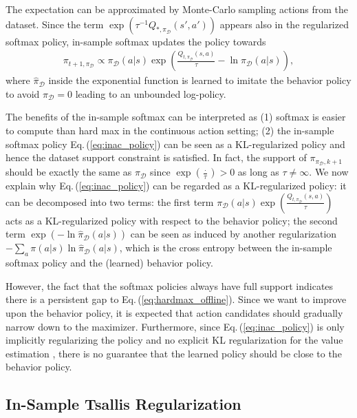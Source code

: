 \documentclass{article}
\newcommand{\AdaBracket}[1]{\left(#1\right)}
\newcommand{\eq}[1]{Eq.\,(#1)}
\newcommand{\datasetOptimalQ}{Q_{*, \pi_{\mathcal{D}}}}
\newcommand{\datasetPolicy}{\pi_{\mathcal{D}}}
\begin{document}
The expectation can be approximated by Monte-Carlo sampling actions from the dataset.
Since the term $\exp\AdaBracket{\tau^{-1}\datasetOptimalQ (s',a')}$ appears also in the regularized softmax policy, in-sample softmax updates the policy towards 
\begin{align}
    \pi_{t+1,\datasetPolicy} \propto  \datasetPolicy(a|s) \exp\AdaBracket{\frac{Q_{t, \datasetPolicy}(s,a)}{\tau} - \ln\hat{\pi}_{\mathcal{D}}(a|s)},
    \label{eq:inac_policy}
\end{align}
where $\hat{\pi}_{\mathcal{D}}$ inside the exponential function is learned to imitate the behavior policy to avoid $\pi_{\mathcal{D}} = 0$ leading to an unbounded log-policy.

The benefits of the in-sample softmax can be interpreted as (1) softmax is easier to compute than hard max in the continuous action setting; 
(2) the in-sample softmax policy \eq{\ref{eq:inac_policy}} can be seen as a KL-regularized policy and hence the dataset support constraint is satisfied.
In fact, the support of $ \pi_{\datasetPolicy, k+1}$ should be exactly the same as $\datasetPolicy$ since $\exp(\frac{\cdot}{\tau}) > 0$ as long as $\tau \neq \infty$.
We now explain why \eq{\ref{eq:inac_policy}} can be regarded as a KL-regularized policy: it can be decomposed into two terms:
the first term $\datasetPolicy(a|s) \exp\AdaBracket{\frac{Q_{t, \datasetPolicy}(s,a)}{\tau} }$ acts as a KL-regularized policy with respect to the behavior policy; 
the second term $\exp\AdaBracket{-\ln\hat{\pi}_{\mathcal{D}}(a|s)}$ can be seen as induced by another regularization $-\sum_{a}{\pi(a|s)}{\ln{\hat{\pi}_{\mathcal{D}}(a|s)}}$, which is the cross entropy between the in-sample softmax policy and the (learned) behavior policy.

However, the fact that the softmax policies always have full support indicates there is a persistent gap to \eq{\ref{eq:hardmax_offline}}.
Since we want to improve upon the behavior policy, it is expected that action candidates should gradually narrow down to the maximizer.
Furthermore, since \eq{\ref{eq:inac_policy}} is only implicitly regularizing the policy and no explicit KL regularization for the value estimation \cite{Wu2020-BehaviorRegularizedAC}, there is no guarantee that the learned policy should be close to the behavior policy.





\subsection{In-Sample Tsallis Regularization}
\end{document}
